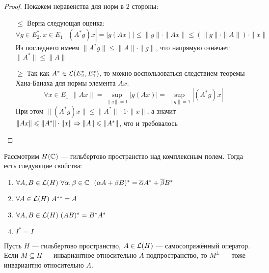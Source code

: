 \begin{proof}
	Покажем неравенства для норм в 2 стороны:
	\begin{itemize}
		\item[$\le$] Верна следующая оценка:
		\[
			\forall g \in E_2^*, x \in E_1\ \ |(A^*g)x| = |g(Ax)| \le \|g\| \cdot \|Ax\| \le (\|g\| \cdot \|A\|) \cdot \|x\|
		\]
		Из последнего имеем $\|A^*g\| \le \|A\| \cdot \|g\|$, что напрямую означает $\|A^*\| \le \|A\|$
		
		\item[$\ge$] Так как $A^* \in \mathcal{L}(E_2^*, E_1^*)$, то можно воспользоваться следствием теоремы Хана-Банаха для нормы элемента $Ax$:
		\[
			\forall x \in E_1\ \ \|Ax\| = \sup_{\|g\| = 1} |g(Ax)| = \sup_{\|g\| = 1} |(A^*g)x|
		\]
		При этом $\|(A^*g)x\| \le \|A^*\| \cdot 1 \cdot \|x\|$, а значит $\|Ax\| \leqslant \|A^*\| \cdot \|x\| \Rightarrow \|A\| \leqslant \|A^*\|$, что и требовалось
	\end{itemize}
\end{proof}

\begin{exercise}
	Рассмотрим $H(\mathbb{C})$ --- гильбертово пространство над комплексным полем. Тогда есть следующие свойства:
	\begin{enumerate}
		\item $\forall A, B \in \mathcal{L}(H)\ \forall \alpha, \beta \in \mathbb{C}\ \ (\alpha A + \beta B)^* = \overline{\alpha}A^* + \overline{\beta}B^*$
		
		\item $\forall A \in \mathcal{L}(H)\ A^{**} = A$
		
		\item $\forall A, B \in \mathcal{L}(H)\ (AB)^* = B^*A^*$
		
		\item $I^* = I$
	\end{enumerate}
\end{exercise}

\begin{exercise}
	Пусть $H$ --- гильбертово пространство, $A \in \mathcal{L}(H)$ --- самосопряжённый оператор. Если $M \subseteq H$ --- инвариантное относительно $A$ подпространство, то $M^\bot$ --- тоже инвариантно относительно $A$.
\end{exercise}